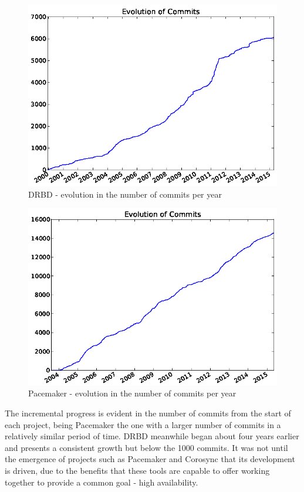 \documentclass[a4paper, 12pt]{book}
\begin{document}
    \begin{figure}[H]
      \centering
      \includegraphics[scale=0.50]{fig8-5.png}
      \caption[Evolution in the number of commits for DRBD]{DRBD - evolution in the number of commits per year}
      \label{fig:fig8-5}
    \end{figure}
    
    \begin{figure}[H]
      \centering
      \includegraphics[scale=0.50]{fig8-6.png}
      \caption[Evolution in the number of commits for Pacemaker]{Pacemaker - evolution in the number of commits per year}
      \label{fig:fig8-6}
    \end{figure}

    
\noindent The incremental progress is evident in the number of commits from the start of each project, being Pacemaker the one with a larger number of commits in a relatively similar period of time. DRBD meanwhile began about four years earlier and presents a consistent growth but below the 1000 commits. It was not until the emergence of projects such as Pacemaker and Corosync that its development is driven, due to the benefits that these tools are capable to offer working together to provide a common goal - high availability.
\end{document}
